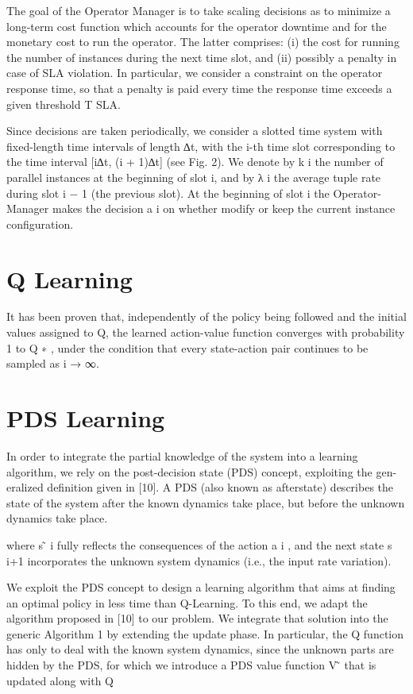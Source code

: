 The goal of the Operator Manager is to take scaling decisions as to minimize
a long-term cost function which accounts for the operator downtime and for the
monetary cost to run the operator. The latter comprises: (i) the cost for running
the number of instances during the next time slot, and (ii) possibly a penalty
in case of SLA violation. In particular, we consider a constraint on the operator
response time, so that a penalty is paid every time the response time exceeds a
given threshold T SLA.

Since decisions are taken periodically, we consider a slotted time system with
fixed-length time intervals of length ∆t, with the i-th time slot corresponding
to the time interval [i∆t, (i + 1)∆t] (see Fig. 2). We denote by k i the number
of parallel instances at the beginning of slot i, and by λ i the average tuple rate
during slot i − 1 (the previous slot). At the beginning of slot i the Operator-
Manager makes the decision a i on whether modify or keep the current instance
configuration.


\section{Q Learning}
\label{sec:reinforcement-learning-q-learning}

It has been proven that, independently of the policy
being followed and the initial values assigned to Q, the learned action-value
function converges with probability 1 to Q ∗ \cite{watkins1992q}, under the condition that every
state-action pair continues to be sampled as i → ∞.


\section{PDS Learning}
\label{reinforcement-learning-pds-learning}

In order to integrate the partial knowledge of the system into a learning
algorithm, we rely on the post-decision state (PDS) concept, exploiting the gen-
eralized definition given in [10]. A PDS (also known as afterstate) describes the
state of the system after the known dynamics take place, but before the unknown
dynamics take place. 

where s  ̃ i fully reflects the consequences of the action a i , and the next state s i+1
incorporates the unknown system dynamics (i.e., the input rate variation).

We exploit the PDS concept to design a learning algorithm that aims at
finding an optimal policy in less time than Q-Learning. To this end, we adapt
the algorithm proposed in [10] to our problem. We integrate that solution into
the generic Algorithm 1 by extending the update phase. In particular, the Q
function has only to deal with the known system dynamics, since the unknown
parts are hidden by the PDS, for which we introduce a PDS value function V  ̃
that is updated along with Q

